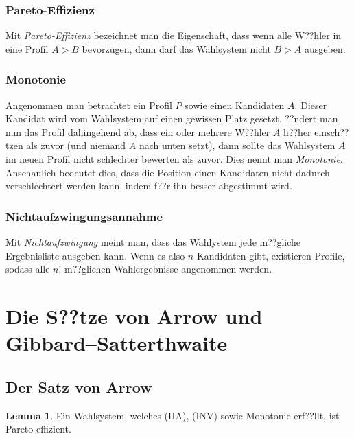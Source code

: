 \documentclass{zirkelblatt1415}
\theoremstyle{definition}
\theoremstyle{definition}
\theoremstyle{definition}
\theoremstyle{definition}
\newtheorem*{lem}{Lemma}
\theoremstyle{remark}
\begin{document}
\subsubsection*{Pareto-Effizienz}

Mit \emph{Pareto-Effizienz} bezeichnet man die Eigenschaft, dass wenn alle W??hler in eine Profil $A>B$ bevorzugen, dann darf das Wahlsystem nicht $B>A$ ausgeben.

\subsubsection*{Monotonie}

Angenommen	man betrachtet ein Profil $P$ sowie einen Kandidaten $A$. Dieser Kandidat wird vom Wahlsystem auf einen gewissen Platz gesetzt. ??ndert man nun das Profil dahingehend ab, dass ein oder mehrere W??hler $A$ h??her einsch??tzen als zuvor (und niemand $A$ nach unten setzt), dann sollte das Wahlsystem $A$ im neuen Profil nicht schlechter bewerten als zuvor. Dies nennt man \emph{Monotonie}. Anschaulich bedeutet dies, dass die Position einen Kandidaten nicht dadurch verschlechtert werden kann, indem f??r ihn besser abgestimmt wird.

\subsubsection*{Nichtaufzwingungsannahme}

Mit \emph{Nichtaufzwingung} meint man, dass das Wahlystem jede m??gliche Ergebnisliste ausgeben kann. Wenn es also $n$ Kandidaten gibt, existieren Profile, sodass alle $n!$ m??glichen Wahlergebnisse angenommen werden.

\section{Die S??tze von Arrow und Gibbard--Satterthwaite}

\subsection{Der Satz von Arrow}

\begin{lem}
Ein Wahlsystem, welches (IIA), (INV) sowie Monotonie erf??llt, ist Pareto-effizient.
\end{lem}
\end{document}
